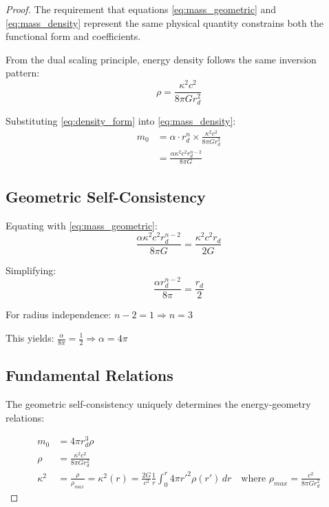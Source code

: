 \documentclass{article}
\begin{document}
\begin{proof}
The requirement that equations \eqref{eq:mass_geometric} and \eqref{eq:mass_density} represent the same physical quantity constrains both the functional form and coefficients.

From the dual scaling principle, energy density follows the same inversion pattern:
\begin{equation}
\rho = \frac{\kappa^2 c^2}{8\pi G r_{d}^2}
\label{eq:density_form}
\end{equation}

Substituting \eqref{eq:density_form} into \eqref{eq:mass_density}:
\begin{align}
m_0 &= \alpha \cdot r_{d}^n \times \frac{\kappa^2 c^2}{8\pi G r_{d}^2} \\
&= \frac{\alpha \kappa^2 c^2 r_{d}^{n-2}}{8\pi G}
\end{align}

\subsection{Geometric Self-Consistency}
Equating with \eqref{eq:mass_geometric}:
\begin{equation}
\frac{\alpha \kappa^2 c^2 r_{d}^{n-2}}{8\pi G} = \frac{\kappa^2 c^2 r_{d}}{2G}
\end{equation}

Simplifying:
\begin{equation}
\frac{\alpha r_{d}^{n-2}}{8\pi} = \frac{r_{d}}{2}
\end{equation}

For radius independence: $n-2 = 1 \Rightarrow n = 3$

This yields: $\frac{\alpha}{8\pi} = \frac{1}{2} \Rightarrow \alpha = 4\pi$

\subsection{Fundamental Relations}
The geometric self-consistency uniquely determines the energy-geometry relations:

\begin{align}
m_0 &= 4\pi r_{d}^3 \rho \label{eq:mass_surface} \\
\rho &= \frac{\kappa^2 c^2}{8\pi G r_{d}^2} \label{eq:density_final} \\
\kappa^2 &= \frac{\rho}{\rho_{max}}=
\kappa^{2}(r)=\frac{2G}{c^{2}}\frac{1}{r}\int_{0}^{r}4\pi r'^{2}\rho(r')\,dr
\quad \text{where } \rho_{max} = \frac{c^2}{8\pi G r_{d}^2} \label{eq:density_ratio}
\end{align}


\end{proof}
\end{document}
